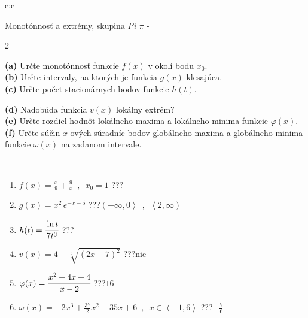 \documentclass[10pt]{report}
\begin{document}
\newpage
\thispagestyle{empty}
\begin{tabular}{c:c}
\begin{minipage}[c][104.5mm][t]{0.5\linewidth}
\begin{center}
\vspace{7mm}
{\huge Monotónnosť a extrémy, skupina \textit{Pi $\pi$} -}\\[5mm]
\begin{minipage}{0.95\linewidth}
\begin{center}
{\small \begin{multicols}{2} \raggedright
\textbf{(a)} Určte monotónnosť funkcie \(f(x)\) v okolí bodu \(x_0\). \\[1mm]
\textbf{(b)} Určte intervaly, na ktorých je funkcia \(g(x)\) klesajúca. \\[1mm]
\textbf{(c)} Určte počet stacionárnych bodov funkcie \(h(t)\). \par \columnbreak
\textbf{(d)} Nadobúda funkcia \(v(x)\) lokálny extrém? \\[1mm]
\textbf{(e)} Určte rozdiel hodnôt lokálneho maxima a lokálneho minima funkcie \(\varphi(x)\). \\[1mm]
\textbf{(f)} Určte súčin \(x\)-ových súradníc bodov globálneho maxima a globálneho minima funkcie \(\omega(x)\) na zadanom intervale. \\[1mm]
\end{multicols}
}
\end{center}
\end{minipage}
\\[4mm]
\begin{minipage}{0.79\linewidth}
\begin{center}
\begin{varwidth}{\linewidth}
\begin{enumerate}
\normalsize
\item $f(x)=\frac{x}{9}+\frac{9}{x} \enspace , \enspace x_0=1$\quad \dotfill\; ???\;\dotfill \quad {}
\item $g(x)=x^2\, e^{-x-5}$\quad \dotfill\; ???\;\dotfill \quad $\left(-\infty , 0\right\rangle\enspace , \enspace \left\langle2 , \infty\right)$
\item $h(t)=\cfrac{\ln t}{7t^3}$\quad \dotfill\; ???\;\dotfill {}
\item $v(x)=4-\sqrt[5]{(2x-7)^2}$\quad \dotfill\; ???\;\dotfill \quad $\text{nie}$
\item $\varphi(x)=\cfrac{x^2+4x+4}{x-2}$\quad \dotfill\; ???\;\dotfill \quad $16$
\item $\omega(x)=-2x^3+\frac{37}{2}x^2-35x+6 \enspace , \enspace x\in\left\langle-1 , 6\right\rangle$\quad \dotfill\; ???\;\dotfill \quad $-\frac{7}{6}$

\end{enumerate}
\end{varwidth}
\end{center}
\end{minipage}
\end{center}
\end{minipage}
\end{tabular}
\end{document}

